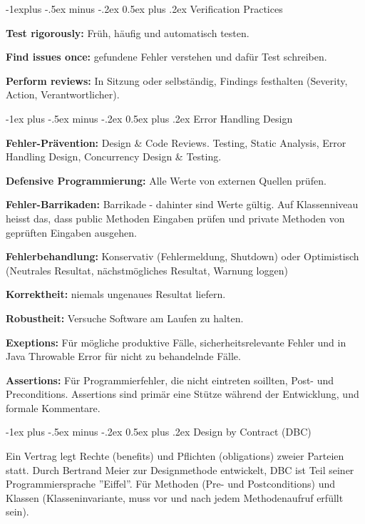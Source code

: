 \documentclass[a4paper, fontsize=6pt]{scrartcl}
\makeatletter
\renewcommand{\section}{\@startsection{section}{1}{0mm}%
    {-1ex plus -.5ex minus -.2ex}%
    {0.5ex plus .2ex}%
    {\normalfont\large\bfseries}}
\renewcommand{\subsection}{\@startsection{subsection}{2}{0mm}%
    {-1explus -.5ex minus -.2ex}%
    {0.5ex plus .2ex}%
    {\normalfont\normalsize\bfseries}}
\makeatother
\begin{document}
\begin{multicols*}{5}
\subsection{Verification Practices}

\textbf{Test rigorously:} Früh, häufig und automatisch testen.

\textbf{Find issues once:} gefundene Fehler verstehen und dafür Test schreiben.

\textbf{Perform reviews:} In Sitzung oder selbständig, Findings festhalten (Severity, Action, Verantwortlicher).

\section{Error Handling Design}

\textbf{Fehler-Prävention:} Design \& Code Reviews. Testing, Static Analysis, Error Handling Design, Concurrency Design \& Testing.

\textbf{Defensive Programmierung:} Alle Werte von externen Quellen prüfen.

\textbf{Fehler-Barrikaden:} Barrikade - dahinter sind Werte gültig. Auf Klassenniveau heisst das, dass public Methoden Eingaben prüfen und private Methoden von geprüften Eingaben ausgehen.

\textbf{Fehlerbehandlung:} Konservativ (Fehlermeldung, Shutdown) oder Optimistisch (Neutrales Resultat, nächstmögliches Resultat, Warnung loggen)

\textbf{Korrektheit:} niemals ungenaues Resultat liefern.

\textbf{Robustheit:} Versuche Software am Laufen zu halten.

\textbf{Exeptions:} Für mögliche produktive Fälle, sicherheitsrelevante Fehler und in Java Throwable Error für nicht zu behandelnde Fälle.

\textbf{Assertions:} Für Programmierfehler, die nicht eintreten soillten, Post- und Preconditions. Assertions sind primär eine Stütze während der Entwicklung, und formale Kommentare.

\section{Design by Contract (DBC)}

Ein Vertrag legt Rechte (benefits) und Pflichten (obligations) zweier Parteien statt. Durch Bertrand Meier zur Designmethode entwickelt, DBC ist Teil seiner Programmiersprache ''Eiffel''. Für Methoden (Pre- und Postconditions) und Klassen (Klasseninvariante, muss vor und nach jedem Methodenaufruf erfüllt sein).


\end{multicols*}
\end{document}
